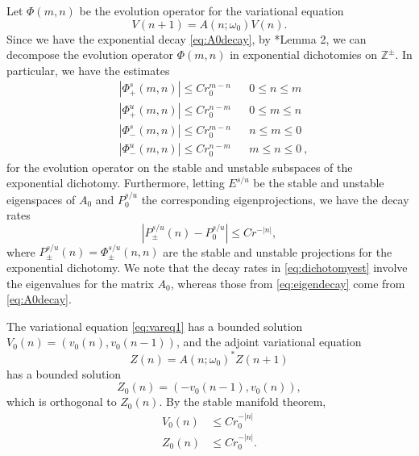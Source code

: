 \documentclass[12pt,reqno]{amsart}
\def\Z{{\mathbb Z}}
\begin{document}
Let $\Phi(m, n)$ be the evolution operator for the variational equation 
\begin{equation}\label{eq:vareq1}
	V(n+1) = A(n; \omega_0) V(n).
\end{equation}
Since we have the exponential decay \cref{eq:A0decay}, by \cite{Parker2020}*{Lemma 2}, we can decompose the evolution operator $\Phi(m, n)$ in exponential dichotomies on $\Z^\pm$. In particular, we have the estimates 
\begin{equation}\label{eq:dichotomyest}
\begin{aligned}
&|\Phi_+^s(m, n)| \leq C r_0^{m - n} && 0 \leq n \leq m \\
&|\Phi_+^u(m, n)| \leq C r_0^{n - m} && 0 \leq m \leq n \\
&|\Phi_-^s(m, n)| \leq C r_0^{m - n} && n \leq m \leq 0 \\
&|\Phi_-^u(m, n)| \leq C r_0^{n - m} && m \leq n \leq 0 \:,
\end{aligned}
\end{equation}
for the evolution operator on the stable and unstable subspaces of the exponential dichotomy. Furthermore, letting $E^{s/u}$ be the stable and unstable eigenspaces of $A_0$ and $P_0^{s/u}$ the corresponding eigenprojections, we have the decay rates
\begin{equation}\label{eq:eigendecay}
	|P_\pm^{s/u}(n) - P_0^{s/u}| \leq C r^{-|n|},
\end{equation}
where $P_\pm^{s/u}(n) = \Phi_\pm^{s/u}(n, n)$ are the stable and unstable projections for the exponential dichotomy. We note that the decay rates in \cref{eq:dichotomyest} involve the eigenvalues for the matrix $A_0$, whereas those from \cref{eq:eigendecay} come from \cref{eq:A0decay}. 

The variational equation \cref{eq:vareq1} has a bounded solution $V_0(n) = (v_0(n), v_0(n-1))$, and the adjoint variational equation 
\begin{equation}\label{eq:adjvareq1}
	Z(n) = A(n; \omega_0)^* Z(n+1)
\end{equation}
has a bounded solution 
\begin{equation}\label{eq:Z0}
	Z_0(n) = (-v_0(n-1), v_0(n)),
\end{equation}
which is orthogonal to $Z_0(n)$. By the stable manifold theorem,
\begin{equation}\label{eq:VZ0estimates}
	\begin{aligned}
		V_0(n) &\leq C r_0^{-|n|} \\
		Z_0(n) &\leq C r_0^{-|n|}.
	\end{aligned}
\end{equation}
\end{document}
